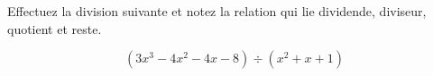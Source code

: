 %
%
    Effectuez la division suivante et notez la relation qui lie dividende, diviseur, quotient et reste.

    \[(3x^3 - 4x^2  - 4x - 8) \div (x^2+x+1) \]
